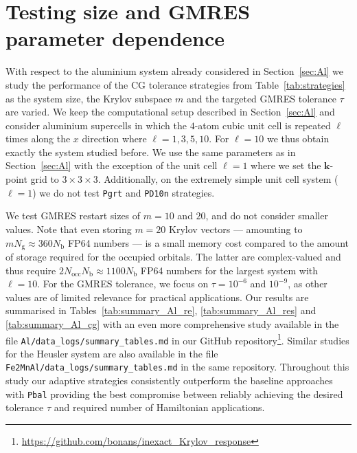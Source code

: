 \documentclass[hidelinks,onefignum,onetabnum]{siamart250211}
\newcommand{\Nocc}{N_{\mathrm{occ}}}
\newcommand{\Nb}{N_{\mathrm{b}}}
\newcommand{\Ng}{N_{\mathrm{g}}}
\newcommand{\sPbal}{\texttt{Pbal}\xspace}
\newcommand{\sPgrt}{\texttt{Pgrt}\xspace}
\newcommand{\sPdnorm}{\texttt{PD10n}\xspace}
\begin{document}
\section{Testing size and GMRES parameter dependence}
\label{supp:aluminium_parameters}
With respect to the aluminium system already considered in Section~\ref{sec:Al}
we study the performance of the CG tolerance strategies from Table~\ref{tab:strategies}
as the system size, the Krylov subspace $m$ and the targeted GMRES tolerance $\tau$ are varied.
We keep the computational setup described in Section~\ref{sec:Al}
and consider aluminium supercells in which the $4$-atom cubic unit cell
is repeated $\ell$ times along the $x$ direction where $\ell = 1, 3, 5, 10$.
For $\ell = 10$ we thus obtain exactly the system studied before.
We use the same parameters as in Section~\ref{sec:Al} with the exception of the
unit cell $\ell=1$ where we set the $\bm k$-point grid to $3 \times 3 \times 3$.
Additionally, on the extremely simple unit cell system ($\ell=1$)
we do not test \sPgrt and \sPdnorm strategies.

We test GMRES restart sizes of $m=10$ and $20$, and do not consider smaller values.
Note that even storing $m=20$ Krylov vectors --- amounting to $m\Ng \approx 360 \Nb$
FP64 numbers --- is a small memory cost compared to the amount of storage required
for the occupied orbitals.
The latter are complex-valued and thus require $2 \Nocc \Nb \approx 1100 \Nb$
FP64 numbers for the largest system with $\ell = 10$.
For the GMRES tolerance, we focus on $\tau = 10^{-6}$ and $10^{-9}$, 
as other values are of limited relevance for practical applications.
Our results are summarised in Tables~\ref{tab:summary_Al_re},
\ref{tab:summary_Al_res} and \ref{tab:summary_Al_cg}
with an even more comprehensive study available in the file
\texttt{Al/data\_logs/summary\_tables.md} in our GitHub repository\footnote{\url{https://github.com/bonans/inexact_Krylov_response}}.
Similar studies for the Heusler system are also available in the file
\texttt{Fe2MnAl/data\_logs/summary\_tables.md} in the same repository.
Throughout this study our adaptive strategies consistently outperform the
baseline approaches with \sPbal providing the best compromise
between reliably achieving the desired tolerance $\tau$
and required number of Hamiltonian applications.

%
%
%
%
%
\end{document}

